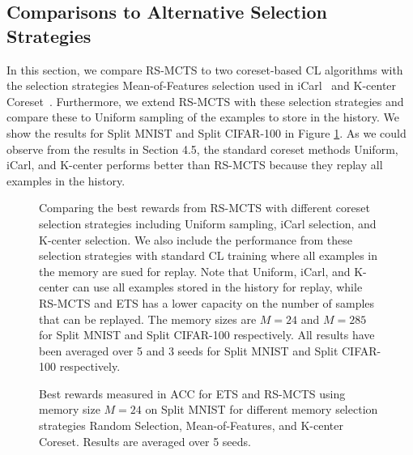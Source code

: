 
\subsection{Comparisons to Alternative Selection Strategies}

In this section, we compare RS-MCTS to two coreset-based CL algorithms with the selection strategies Mean-of-Features selection used in iCarl~\citep{rebuffi2017icarl} and K-center Coreset~\citep{nguyen2017variational}. Furthermore, we extend RS-MCTS with these selection strategies and compare these to Uniform sampling of the examples to store in the history. We show the results for Split MNIST and Split CIFAR-100 in Figure \ref{fig:comparison_alternative_memory_selection}. As we could observe from the results in Section 4.5, the standard coreset methods Uniform, iCarl, and K-center performs better than RS-MCTS because they replay all examples in the history. 


\begin{figure}[h]
  \centering
  \setlength{\figwidth}{0.37\textwidth}
  \setlength{\figheight}{.20\textheight}
  \caption{Comparing the best rewards from RS-MCTS with different coreset selection strategies including Uniform sampling, iCarl selection, and K-center selection. We also include the performance from these selection strategies with standard CL training where all examples in the memory are sued for replay. Note that Uniform, iCarl, and K-center can use all examples stored in the history for replay, while RS-MCTS and ETS has a lower capacity on the number of samples that can be replayed. The memory sizes are $M=24$ and $M=285$ for Split MNIST and Split CIFAR-100 respectively. 
  All results have been averaged over 5 and 3 seeds for Split MNIST and Split CIFAR-100 respectively. 
  }
  \label{fig:comparison_alternative_memory_selection}
\end{figure}


\begin{figure}[h!]
  \centering
  \setlength{\figwidth}{0.32\textwidth}
  \setlength{\figheight}{0.25\textwidth}
  \vspace{-6pt}
  \caption{Best rewards measured in ACC for ETS and RS-MCTS using memory size $M=24$ on Split MNIST for different memory selection strategies Random Selection, Mean-of-Features, and K-center Coreset. Results are averaged over 5 seeds. 
  }
  \label{fig:MNIST_mcts_best_rewards_M24_selection_methods_appendix}
\end{figure}